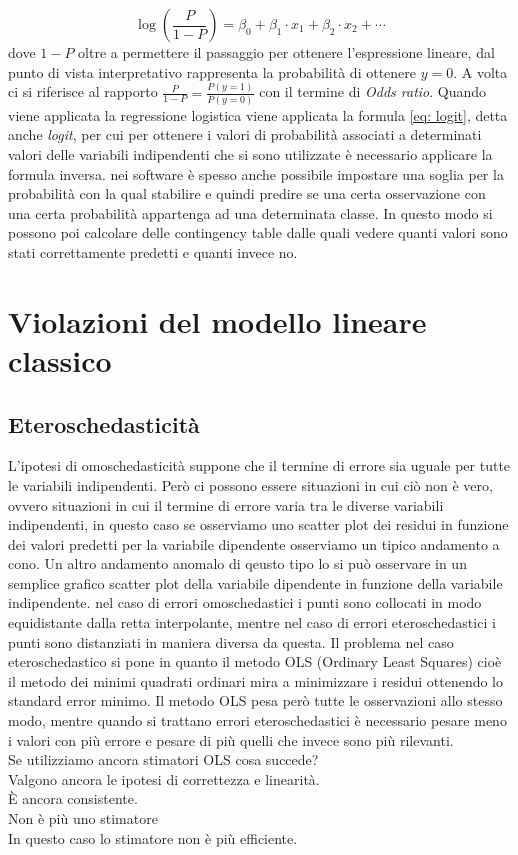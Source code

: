 \documentclass[]{article}
\begin{document}
\begin{equation}
\log(\frac{P}{1-P}) = \beta_0 + \beta_1 \cdot x_1 + \beta_2 \cdot x_2 + \cdots
\label{eq: logit}
\end{equation}
dove $1-P$ oltre a permettere il passaggio per ottenere l'espressione lineare, dal punto di vista interpretativo rappresenta la probabilità di ottenere $y = 0$. A volta ci si riferisce al rapporto $\frac{P}{1-P}=\frac{P(y=1)}{P(y=0)}$ con il termine di \textit{Odds ratio}. Quando viene applicata la regressione logistica viene applicata la formula \eqref{eq: logit}, detta anche \textit{logit}, per cui per ottenere i valori di probabilità associati a determinati valori delle variabili indipendenti che si sono utilizzate è necessario applicare la formula inversa.
nei software è spesso anche possibile impostare una soglia per la probabilità con la qual stabilire e quindi predire se una certa osservazione con una certa probabilità appartenga ad una determinata classe. In questo modo si possono poi calcolare delle contingency table dalle quali vedere quanti valori sono stati correttamente predetti e quanti invece no.

\section{Violazioni del modello lineare classico}

\subsection{Eteroschedasticità}
L'ipotesi di omoschedasticità suppone che il termine di errore sia uguale per tutte le variabili indipendenti. Però ci possono essere situazioni in cui ciò non è vero, ovvero situazioni in cui il termine di errore varia tra le diverse variabili indipendenti,  in questo caso se osserviamo uno scatter plot dei residui in funzione dei valori predetti per la variabile dipendente osserviamo un tipico andamento a cono. Un altro andamento anomalo di qeusto tipo lo si può osservare in un semplice grafico scatter plot della variabile dipendente in funzione della variabile indipendente. nel caso di errori omoschedastici i punti sono collocati in modo equidistante dalla retta interpolante, mentre nel caso di errori eteroschedastici i punti sono distanziati in maniera diversa da questa. Il problema nel caso eteroschedastico si pone in quanto il metodo OLS (Ordinary Least Squares) cioè il metodo dei minimi quadrati ordinari mira a minimizzare i residui ottenendo lo standard error minimo. Il metodo OLS pesa però tutte le osservazioni allo stesso modo, mentre quando si trattano errori eteroschedastici è necessario pesare meno i valori con più errore e pesare di più quelli che invece sono più rilevanti.\\
Se utilizziamo ancora stimatori OLS cosa succede?\\
Valgono ancora le ipotesi di correttezza e linearità.\\
È ancora consistente.\\
Non è più uno stimatore\\
In 	questo caso lo stimatore non è più efficiente.
\end{document}
